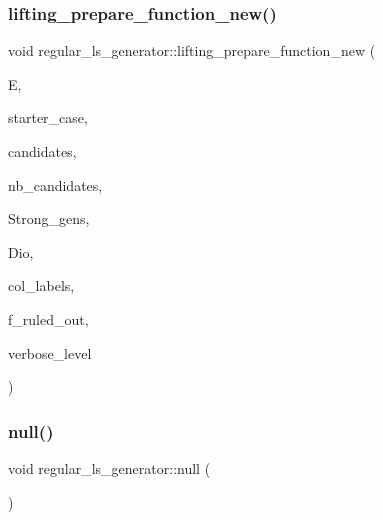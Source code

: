 \subsubsection{\texorpdfstring{lifting\+\_\+prepare\+\_\+function\+\_\+new()}{lifting\_prepare\_function\_new()}}
{\footnotesize\ttfamily void regular\+\_\+ls\+\_\+generator\+::lifting\+\_\+prepare\+\_\+function\+\_\+new (\begin{DoxyParamCaption}\item[{\mbox{\hyperlink{classexact__cover}{exact\+\_\+cover}} $\ast$}]{E,  }\item[{\mbox{\hyperlink{galois_8h_a09fddde158a3a20bd2dcadb609de11dc}{I\+NT}}}]{starter\+\_\+case,  }\item[{\mbox{\hyperlink{galois_8h_a09fddde158a3a20bd2dcadb609de11dc}{I\+NT}} $\ast$}]{candidates,  }\item[{\mbox{\hyperlink{galois_8h_a09fddde158a3a20bd2dcadb609de11dc}{I\+NT}}}]{nb\+\_\+candidates,  }\item[{\mbox{\hyperlink{classstrong__generators}{strong\+\_\+generators}} $\ast$}]{Strong\+\_\+gens,  }\item[{\mbox{\hyperlink{classdiophant}{diophant}} $\ast$\&}]{Dio,  }\item[{\mbox{\hyperlink{galois_8h_a09fddde158a3a20bd2dcadb609de11dc}{I\+NT}} $\ast$\&}]{col\+\_\+labels,  }\item[{\mbox{\hyperlink{galois_8h_a09fddde158a3a20bd2dcadb609de11dc}{I\+NT}} \&}]{f\+\_\+ruled\+\_\+out,  }\item[{\mbox{\hyperlink{galois_8h_a09fddde158a3a20bd2dcadb609de11dc}{I\+NT}}}]{verbose\+\_\+level }\end{DoxyParamCaption})}

\mbox{\label{classregular__ls__generator_affba5c26b9354a220b8be161cb1da5b4}} 
\subsubsection{\texorpdfstring{null()}{null()}}
{\footnotesize\ttfamily void regular\+\_\+ls\+\_\+generator\+::null (\begin{DoxyParamCaption}{ }\end{DoxyParamCaption})}

\mbox{\label{classregular__ls__generator_a3de40efbd193d8021e7182ff8fbbf6b7}} 
